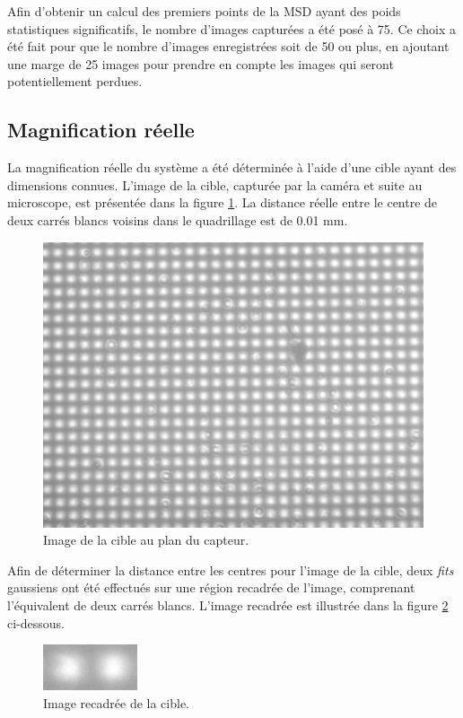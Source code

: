 \documentclass[11pt,letterpaper]{article}
\begin{document}
Afin d'obtenir un calcul des premiers points de la MSD ayant des poids statistiques significatifs, le nombre d'images capturées a été posé à 75. 
Ce choix a été fait pour que le nombre d'images enregistrées soit de 50 ou plus, en ajoutant une marge de 25 images pour prendre en compte les images qui seront 
potentiellement perdues.


\subsection{Magnification réelle}
La magnification réelle du système a été déterminée à l'aide d'une cible ayant des dimensions connues. L'image de la cible, capturée par la
caméra et suite au microscope, est présentée dans la figure \ref{cible}. La distance réelle entre le centre de deux carrés blancs voisins dans le 
quadrillage est de 0.01 mm.
\begin{figure}[H]
  \centering
  \includegraphics[scale=0.2]{magnification_rele.png}
  \caption{Image de la cible au plan du capteur.}
  \label{cible}
\end{figure}
Afin de déterminer la distance entre les centres pour l'image de la cible, deux \textit{fits} gaussiens ont
été effectués sur une région recadrée de l'image, comprenant l'équivalent de deux carrés blancs. L'image recadrée est illustrée dans la 
figure \ref{crop} ci-dessous.
\begin{figure}[H]
  \centering
  \includegraphics[scale=2]{magnification_rele_crop.png}
  \caption{Image recadrée de la cible.}
  \label{crop}
\end{figure}
\end{document}
